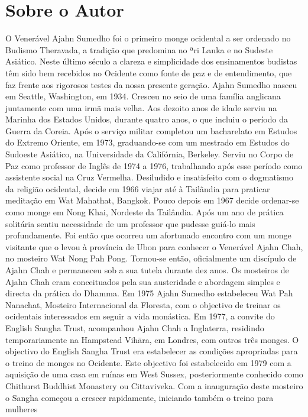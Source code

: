 \section{Sobre o Autor}

O Venerável Ajahn Sumedho foi o primeiro monge ocidental a ser ordenado no Budismo Theravada, a tradição que
predomina no ªri Lanka e no Sudeste Asiático. Neste último
século a clareza e simplicidade dos ensinamentos budistas
têm sido bem recebidos no Ocidente como fonte de paz e de
entendimento, que faz frente aos rigorosos testes da nossa
presente geração.
Ajahn Sumedho nasceu em Seattle, Washington, em
1934. Cresceu no seio de uma família anglicana juntamente
com uma irmã mais velha. Aos dezoito anos de idade serviu
na Marinha dos Estados Unidos, durante quatro anos, o que
incluiu o período da Guerra da Coreia. Após o serviço militar
completou um bacharelato em Estudos do Extremo Oriente,
em 1973, graduando-se com um mestrado em Estudos do
Sudoeste Asiático, na Universidade da Califórnia, Berkeley.
Serviu no Corpo de Paz como professor de Inglês de 1974 a
1976, trabalhando após esse período como assistente social na
Cruz Vermelha.
Desiludido e insatisfeito com o dogmatismo da religião
ocidental, decide em 1966 viajar até à Tailândia para praticar
meditação em Wat Mahathat, Bangkok. Pouco depois em
1967 decide ordenar-se como monge em Nong Khai,
Nordeste da Tailândia. Após um ano de prática solitária sentiu
necessidade de um professor que pudesse guiá-lo mais
profundamente. Foi então que ocorreu um afortunado encontro
com um monge visitante que o levou à província de Ubon
para conhecer o Venerável Ajahn Chah, no mosteiro Wat
Nong Pah Pong. Tornou-se então, oficialmente um discípulo
de Ajahn Chah e permaneceu sob a sua tutela durante dez
anos. Os mosteiros de Ajahn Chah eram conceituados pela
sua austeridade e abordagem simples e directa da prática do
Dhamma. Em 1975 Ajahn Sumedho estabeleceu Wat Pah
Nanachat, Mosteiro Internacional da Floresta, com o objectivo de treinar os ocidentais interessados em seguir a vida
monástica.
Em 1977, a convite do English Sangha Trust, acompanhou
Ajahn Chah a Inglaterra, residindo temporariamente na
Hampstead Vihāra, em Londres, com outros três monges. O
objectivo do English Sangha Trust era estabelecer as condições
apropriadas para o treino de monges no Ocidente. Este
objectivo foi estabelecido em 1979 com a aquisição de uma
casa em ruínas em West Sussex, posteriormente conhecido
como Chithurst Buddhist Monastery ou Cittaviveka.
Com a inauguração deste mosteiro o Sangha começou a
crescer rapidamente, iniciando também o treino para mulheres
